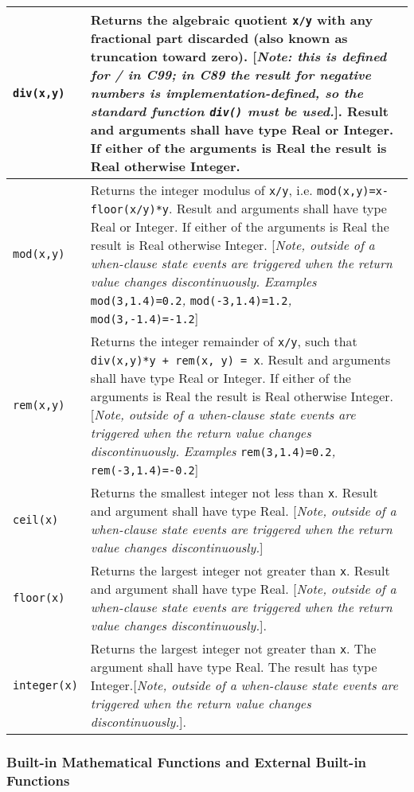 \begin{longtable}{|p{2cm}|p{12cm}|} \hline
\endhead
\lstinline!div(x,y)! & Returns the algebraic quotient \lstinline!x/y! with any fractional part
discarded (also known as truncation toward zero). {[}\emph{Note: this is
defined for / in C99; in C89 the result for negative numbers is
implementation-defined, so the standard function \lstinline!div()! must be
used.}{]}. Result and arguments shall have type Real or Integer. If
either of the arguments is Real the result is Real otherwise
Integer.\\ \hline
\lstinline!mod(x,y)! & Returns the integer modulus of \lstinline!x/y!, i.e.
\lstinline!mod(x,y)=x-floor(x/y)*y!. Result and arguments shall have type Real or
Integer. If either of the arguments is Real the result is Real otherwise
Integer. {[}\emph{Note, outside of a when-clause state events are
triggered when the return value changes discontinuously. Examples}
\lstinline!mod(3,1.4)=0.2!\emph{,} \lstinline!mod(-3,1.4)=1.2!\emph{,}
\lstinline!mod(3,-1.4)=-1.2!{]}\\ \hline
\lstinline!rem(x,y)! & Returns the integer remainder of \lstinline!x/y!, such that \lstinline!div(x,y)*y + rem(x, y) = x!. Result and arguments shall have type Real or Integer. If
either of the arguments is Real the result is Real otherwise Integer.
{[}\emph{Note, outside of a when-clause state events are triggered when
the return value changes discontinuously. Examples}
\lstinline!rem(3,1.4)=0.2!\emph{,} \lstinline!rem(-3,1.4)=-0.2!{]}\\ \hline
\lstinline!ceil(x)! & Returns the smallest integer not less than \lstinline!x!. Result and
argument shall have type Real. {[}\emph{Note, outside of a when-clause
state events are triggered when the return value changes
discontinuously.}{]}\\ \hline
\lstinline!floor(x)! & Returns the largest integer not greater than \lstinline!x!. Result and
argument shall have type Real. {[}\emph{Note, outside of a when-clause
state events are triggered when the return value changes
discontinuously.}{]}.\\ \hline
\lstinline!integer(x)! & Returns the largest integer not greater
than \lstinline!x!. The argument shall have type Real. The result has type
Integer.{[}\emph{Note, outside of a when-clause state
events are triggered when the return value changes
discontinuously.}{]}.\\ \hline
\end{longtable}

\subsubsection{Built-in Mathematical Functions and External Built-in Functions}

